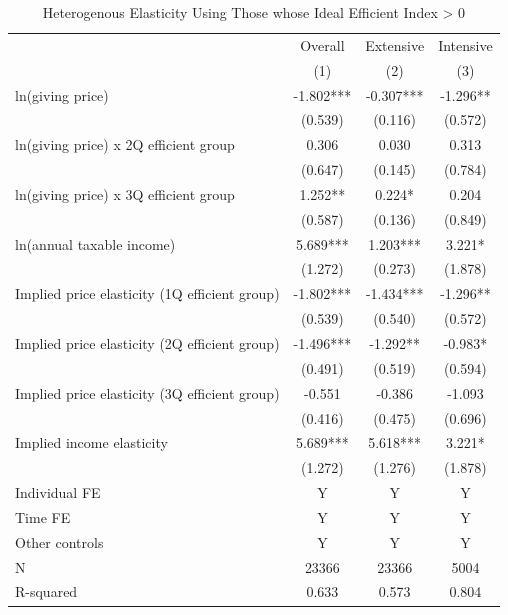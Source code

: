 \documentclass[ review  , 3p ]{elsarticle}
\begin{document}
  \begin{table}

  \caption{\label{tab:kableSubsetHeteroElasticity}Heterogenous Elasticity Using Those whose Ideal Efficient Index > 0}
  \centering
  \fontsize{8}{10}\selectfont
  \begin{threeparttable}
  \begin{tabular}[t]{lccc}
  \toprule
  \multicolumn{1}{c}{ } & \multicolumn{1}{c}{Overall} & \multicolumn{1}{c}{Extensive} & \multicolumn{1}{c}{Intensive} \\
  \cmidrule(l{3pt}r{3pt}){2-2} \cmidrule(l{3pt}r{3pt}){3-3} \cmidrule(l{3pt}r{3pt}){4-4}
   & (1) & (2) & (3)\\
  \midrule
  ln(giving price) & -1.802*** & -0.307*** & -1.296**\\
   & (0.539) & (0.116) & (0.572)\\
  ln(giving price) x 2Q efficient group & 0.306 & 0.030 & 0.313\\
   & (0.647) & (0.145) & (0.784)\\
  ln(giving price) x 3Q efficient group & 1.252** & 0.224* & 0.204\\
   & (0.587) & (0.136) & (0.849)\\
  ln(annual taxable income) & 5.689*** & 1.203*** & 3.221*\\
   & (1.272) & (0.273) & (1.878)\\
  Implied price elasticity (1Q efficient group) & -1.802*** & -1.434*** & -1.296**\\
   & (0.539) & (0.540) & (0.572)\\
  Implied price elasticity (2Q efficient group) & -1.496*** & -1.292** & -0.983*\\
   & (0.491) & (0.519) & (0.594)\\
  Implied price elasticity (3Q efficient group) & -0.551 & -0.386 & -1.093\\
   & (0.416) & (0.475) & (0.696)\\
  Implied income elasticity & 5.689*** & 5.618*** & 3.221*\\
   & (1.272) & (1.276) & (1.878)\\
  Individual FE & Y & Y & Y\\
  Time FE & Y & Y & Y\\
  Other controls & Y & Y & Y\\
  N & 23366 & 23366 & 5004\\
  R-squared & 0.633 & 0.573 & 0.804\\
  \bottomrule
  \end{tabular}

\end{threeparttable}
\end{table}
\end{document}
